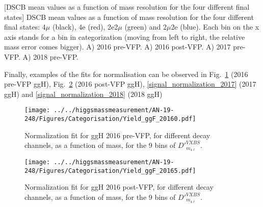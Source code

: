 \begin{multiFigure}
    \begin{center}
            [DSCB mean values as a function of mass resolution for the four different final states]
            {DSCB mean values as a function of mass resolution for the four different final states: 4$\mu$ (black),
            4e (red), 2e2$\mu$ (green) and 2$\mu$2e (blue). Each bin on the x axis stands for a bin 
            in categorization (moving from left to right, the relative mass error comes bigger). 
            \;A) 2016 pre-VFP.
            \;A) 2016 post-VFP.
            \;A) 2017 pre-VFP.
            \;A) 2018 pre-VFP.
            }
        \label{MeanDependence}
    \end{center}
\end{multiFigure}
Finally, examples of the fits for normalisation can be observed in 
Fig.~\ref{signal_normalization_20160} (2016 pre-VFP ggH),
Fig.~\ref{signal_normalization_20165} (2016 post-VFP ggH), 
\ref{signal_normalization_2017} (2017 ggH) and 
\ref{signal_normalization_2018} (2018 ggH)
\begin{figure}[!htbp]
\begin{center}
		\texttt{[image: ../../higgsmassmeasurement/AN-19-248/Figures/Categorisation/Yield\_ggF\_20160.pdf]}
\caption{
Normalization fit for ggH 2016 pre-VFP, for different decay channels, as a function
of mass, for the 9 bins of $D'^{VXBS}_{m_{4\ell}}$.}
\label{signal_normalization_20160}
\end{center}
\end{figure}
\begin{figure}[!htbp]
\begin{center}
		\texttt{[image: ../../higgsmassmeasurement/AN-19-248/Figures/Categorisation/Yield\_ggF\_20165.pdf]}
\caption{
Normalization fit for ggH 2016 post-VFP, for different decay channels, as a function
of mass, for the 9 bins of $D'^{VXBS}_{m_{4\ell}}$.}
\label{signal_normalization_20165}
\end{center}
\end{figure}
